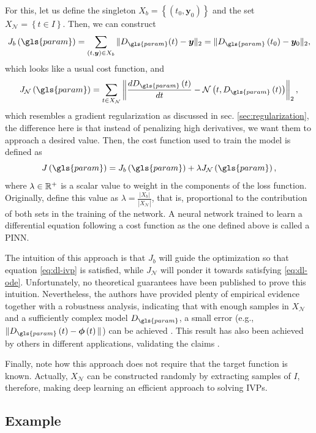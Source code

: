 For this, let us define the singleton $X_b=\left\{ \left( t_0,\bm{y}_0 \right)  \right\} $ and the set $X_{\mathcal{N}}=\left\{ t\in I \right\} $. Then, we can construct \[
    J_b\left( \gls{param} \right) = \sum_{\left( t,\bm{y} \right) \in X_b } \|D_{\gls{param}}(t) - \bm{y}\|_2 = \|D_{\gls{param}}\left( t_0 \right) -\bm{y}_0\|_2
,\] which looks like a usual cost function, and \[
J_{\mathcal{N}}\left( \gls{param} \right) = \sum_{t \in X_{\mathcal{N}}} \left\| \frac{d D_{\gls{param}}\left( t \right) }{dt} - \mathcal{N}\left( t,D_{\gls{param}}\left( t \right)  \right)  \right\|_2
,\] which resembles a gradient regularization as discussed in sec. \ref{sec:regularization}, the difference here is that instead of penalizing high derivatives, we want them to approach a desired value.
Then, the cost function used to train the model is defined as \[
J\left( \gls{param} \right) = J_b\left( \gls{param} \right) + \lambda J_{\mathcal{N}}\left( \gls{param} \right) 
,\] where $\lambda \in \mathbb{R}^+$ is a scalar value to weight in the components of the loss function.
Originally, \textcite{Raissi2019} define this value as $\lambda = \frac{|X_{b}|}{|X_{\mathcal{N}}|}$, that is, proportional to the contribution of both sets in the training of the network.
A neural network trained to learn a differential equation following a cost function as the one defined above is called a \gls{PINN}.

The intuition of this approach is that $J_b$ will guide the optimization so that equation \eqref{eq:dl-ivp} is satisfied, while  $J_{\mathcal{N}}$ will ponder it towards satisfying \eqref{eq:dl-ode}.
Unfortunately, no theoretical guarantees have been published to prove this intuition.
Nevertheless, the authors have provided plenty of empirical evidence together with a robustness analysis, indicating that with enough samples in $X_{\mathcal{N}}$ and a sufficiently complex model $D_{\gls{param}}$, a small error (e.g., $\|D_{\gls{param}}\left( t \right)-\bm{\phi}\left( t \right) \| $) can be achieved \cite{Raissi2019}.
This result has also been achieved by others in different applications, validating the claims \cite{noakoasteen_physics-informed_2020,zhang_physics-informed_2020,Arnold2021,Yucesan2022}.

Finally, note how this approach does not require that the target function is known.
Actually, $X_{\mathcal{N}}$ can be constructed randomly by extracting samples of $I$,
therefore, making deep learning an efficient approach to solving \gls{IVP}s.

\subsection*{Example}

